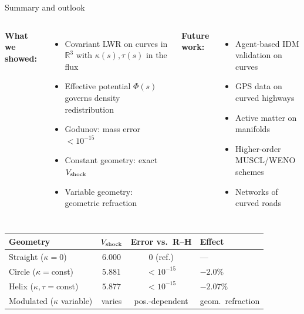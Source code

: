 \documentclass[aspectratio=169,11pt]{beamer}
\begin{document}
\begin{frame}{Summary and outlook}
\vspace{-2pt}
\begin{columns}[T]
  \textbf{What we showed:}
  \begin{itemize}
    \setlength\itemsep{3pt}
    \item Covariant LWR on curves in $\mathbb{R}^3$
          with $\kappa(s),\tau(s)$ in the flux
    \item Effective potential $\Phi(s)$ governs
          density redistribution
    \item Godunov: mass error $< 10^{-15}$
    \item Constant geometry: \alert{exact} $V_{\rm shock}$
    \item Variable geometry: \alert{geometric refraction}
  \end{itemize}

  \textbf{Future work:}
  \begin{itemize}
    \setlength\itemsep{3pt}
    \item Agent-based IDM validation on curves
    \item GPS data on curved highways
    \item Active matter on manifolds
    \item Higher-order MUSCL/WENO schemes
    \item Networks of curved roads
  \end{itemize}
\end{columns}

\vspace{2pt}
\begin{center}
\renewcommand{\arraystretch}{1.05}
\footnotesize
\begin{tabular}{@{}lccl@{}}
  \toprule
  \textbf{Geometry} & $V_{\rm shock}$ & \textbf{Error vs.\ R--H} & \textbf{Effect} \\
  \midrule
  Straight ($\kappa\!=\!0$) & $6.000$ & $0$ (ref.) & --- \\
  Circle ($\kappa\!=\!$const) & $5.881$ & $< 10^{-15}$ & $-2.0\%$ \\
  Helix ($\kappa,\tau\!=\!$const) & $5.877$ & $< 10^{-15}$ & $-2.07\%$ \\
  Modulated ($\kappa$ variable) & varies & pos.-dependent & geom.\ refraction \\
  \bottomrule
\end{tabular}
\normalsize
\end{center}
\end{frame}
\end{document}
